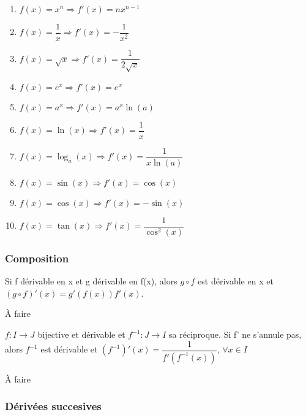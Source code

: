 \documentclass[a4paper, 12pt]{article}
\begin{document}
\begin{methode}
    \begin{enumerate}
        \item $f(x) = x^n \Rightarrow f'(x) = nx^{n-1}$
        \item $f(x) = \dfrac{1}{x} \Rightarrow f'(x) = -\dfrac{1}{x^2}$
        \item $f(x) = \sqrt{x} \Rightarrow f'(x) = \dfrac{1}{2\sqrt{x}}$
        \item $f(x) = e^x \Rightarrow f'(x) = e^x$
        \item $f(x) = a^x \Rightarrow f'(x) = a^x\ln(a)$
        \item $f(x) = \ln(x) \Rightarrow f'(x) = \dfrac{1}{x}$
        \item $f(x) = \log_a(x) \Rightarrow f'(x) = \dfrac{1}{x\ln(a)}$
        \item $f(x) = \sin(x) \Rightarrow f'(x) = \cos(x)$
        \item $f(x) = \cos(x) \Rightarrow f'(x) = -\sin(x)$
        \item $f(x) = \tan(x) \Rightarrow f'(x) = \dfrac{1}{\cos^2(x)}$
    \end{enumerate}
\end{methode}

\subsubsection{Composition}

\begin{proposition}
    Si f dérivable en x et g dérivable en f(x), alors $g \circ f$ est dérivable en x et $(g \circ f)'(x) = g'(f(x))f'(x)$.
\end{proposition}

\begin{demonstration}
    À faire
\end{demonstration}

\begin{corollaire}
    $f: I \rightarrow J$ bijective et dérivable et $f^{-1}: J \rightarrow I$ sa réciproque.
    Si f' ne s'annule pas, alors $f^{-1}$ est dérivable et $(f^{-1})'(x) = \dfrac{1}{f'(f^{-1}(x))}$, $\forall x \in I$
\end{corollaire}

\begin{demonstration}
    À faire
\end{demonstration}

\subsubsection{Dérivées succesives}
\end{document}

